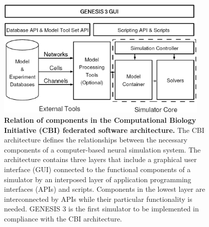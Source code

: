 \documentclass[10pt]{article}
\begin{document}
\begin{figure}[ht]
\begin{center}
\includegraphics[width=4in]{figures/G3arch.eps}
\end{center}
\caption{
{\bf Relation of components in the Computational Biology Initiative (CBI) federated software architecture.} The CBI architecture defines the relationships between the necessary components of a computer-based neural simulation system. The architecture contains three layers that include a graphical user interface (GUI) connected to the functional components of a simulator by an interposed layer of application programming interfaces (APIs) and scripts. Components in the lowest layer are interconnected by APIs while their particular functionality is needed. GENESIS 3 is the first simulator to be implemented in compliance with the CBI architecture.
}
\label{fig:cbi-arch}
\end{figure}

\clearpage

\end{document}
